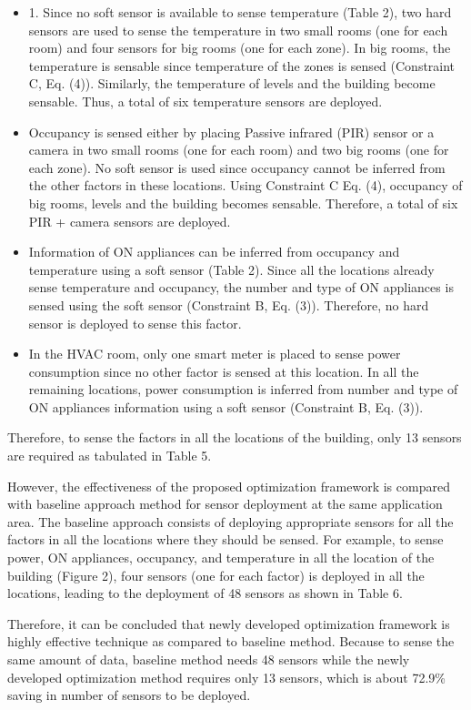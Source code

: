 \documentclass[]{interact}
\theoremstyle{plain}%
\theoremstyle{definition}
\theoremstyle{remark}
\begin{document}
\begin{itemize}
  \item 1.	Since no soft sensor is available to sense temperature (Table 2), two hard sensors are used to sense the temperature in two small rooms (one for each room) and four sensors for big rooms (one for each zone). In big rooms, the temperature is sensable since temperature of the zones is sensed (Constraint C, Eq. (4)). Similarly, the temperature of levels and the building become sensable. Thus, a total of six temperature sensors are deployed.
  \item Occupancy is sensed either by placing Passive infrared (PIR) sensor or a camera in two small rooms (one for each room) and two big rooms (one for each zone). No soft sensor is used since occupancy cannot be inferred from the other factors in these locations. Using Constraint C Eq. (4), occupancy of big rooms, levels and the building becomes sensable. Therefore, a total of six PIR + camera sensors are deployed.
  \item Information of ON appliances can be inferred from occupancy and temperature using a soft sensor (Table 2). Since all the locations already sense temperature and occupancy, the number and type of ON appliances is sensed using the soft sensor (Constraint B, Eq. (3)). Therefore, no hard sensor is deployed to sense this factor.
  \item In the HVAC room, only one smart meter is placed to sense power consumption since no other factor is sensed at this location. In all the remaining locations, power consumption is inferred from number and type of ON appliances information using a soft sensor (Constraint B, Eq. (3)).
\end{itemize}

Therefore, to sense the factors in all the locations of the building, only 13 sensors are required as tabulated in Table 5.

However, the effectiveness of the proposed optimization framework is compared with baseline approach method for sensor deployment at the same application area. The baseline approach consists of deploying appropriate sensors for all the factors in all the locations where they should be sensed. For example, to sense power, ON appliances, occupancy, and temperature in all the location of the building (Figure 2), four sensors (one for each factor) is deployed in all the locations, leading to the deployment of 48 sensors as shown in Table 6.

Therefore, it can be concluded that newly developed optimization framework is highly effective technique as compared to baseline method. Because to sense the same amount of data, baseline method needs 48 sensors while the newly developed optimization method requires only 13 sensors, which is about 72.9\% saving in number of sensors to be deployed. 
\end{document}
